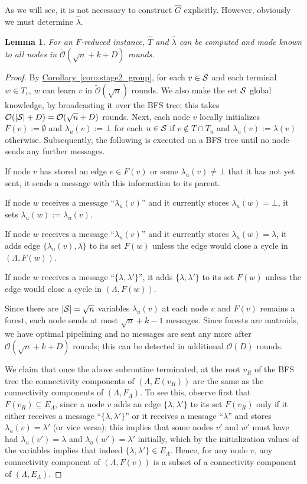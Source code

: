 \documentclass[letterpaper,11pt]{article}
\newtheorem{lemma}[theorem]{Lemma}
\newcommand{\namedref}[2]{\hyperref[#2]{#1~\ref*{#2}}}
\newcommand{\corollaryref}[1]{\namedref{Corollary}{#1}}
\newcommand{\BO}{\mathcal{O}}
\newcommand{\Comp}{\lambda}
\begin{document}
As we will see, it is not necessary to construct $\hat{G}$ explicitly. However,
obviously we must determine $\hat{\Comp}$.

\begin{lemma}\label{lemma:stage2_compute}
For an $F$-reduced instance, $\hat{T}$ and $\hat{\Comp}$ can be computed and
made known to all nodes in $\tilde{\BO}(\sqrt{n}+k+D)$ rounds.
\end{lemma}
\begin{proof}
By \corollaryref{coro:stage2_group}, for each $v\in {\cal S}$ and each terminal
$w\in T_v$, $w$ can learn $v$ in $\tilde{\BO}(\sqrt{n})$ rounds. We also make
the set ${\cal S}$ global knowledge, by broadcasting it over the BFS tree; this
takes $\BO(|{\cal S}|+D)=\BO(\sqrt{n}+D)$ rounds. Next, each node
$v$ locally initializes $F(v):=\emptyset$ and $\Comp_u(v):=\bot$ for each
$u\in {\cal S}$ if $v\notin T\cap T_u$ and $\Comp_u(v):=\Comp(v)$ otherwise.
Subsequently, the following is executed on a BFS tree until no node sends any
further messages.
\begin{compactitem}
\item If node $v$ has stored an edge $e\in F(v)$ or some $\Comp_u(v)\neq
\bot$ that it has not yet sent, it sends a message with this information to its
parent.
\item If node $w$ receives a message ``$\Comp_u(v)$'' and it currently stores
$\Comp_u(w)=\bot$, it sets $\Comp_u(w):=\Comp_u(v)$.
\item If node $w$ receives a message ``$\Comp_u(v)$'' and it currently stores
$\Comp_u(w)=\Comp$, it adds edge $\{\Comp_u(v),\Comp\}$ to its set $F(w)$
unless the edge would close a cycle in $(\Lambda,F(w))$.
\item If node $w$ receives a message ``$\{\Comp,\Comp'\}$'', it adds
$\{\Comp,\Comp'\}$ to its set $F(w)$ unless the edge would close a cycle in
$(\Lambda,F(w))$.
\end{compactitem}
Since there are $|{\cal S}|=\sqrt{n}$ variables $\Comp_u(v)$ at each node $v$
and $F(v)$ remains a forest, each node sends at most $\sqrt{n}+k-1$ messages.
Since forests are matroids, we have optimal pipelining and no messages are sent
any more after $\BO(\sqrt{n}+k+D)$ rounds; this can be detected in additional
$\BO(D)$ rounds.

We claim that once the above subroutine terminated, at the root $v_R$ of the BFS
tree the connectivity components of $(\Lambda,E(v_R))$ are the same as the
connectivity components of $(\Lambda,F_{\Lambda})$. To see this, observe first
that $F(v_R)\subseteq E_{\Lambda}$, since a node $v$ adds an edge
$\{\Comp,\Comp'\}$ to its set $F(v_R)$ only if it either receives a message
``$\{\Comp,\Comp'\}$'' or it receives a message ``$\Comp$'' and stores
$\Comp_u(v)=\Comp'$ (or vice versa); this implies that some nodes $v'$ and
$w'$ must have had $\Comp_u(v')=\Comp$ and $\Comp_u(w')=\Comp'$ initially, which
by the initialization values of the variables implies that indeed
$\{\Comp,\Comp'\}\in E_{\Lambda}$. Hence, for any node $v$, any connectivity
component of $(\Lambda,F(v))$ is a subset of a connectivity component of
$(\Lambda,E_{\Lambda})$.


\end{proof}
\end{document}
